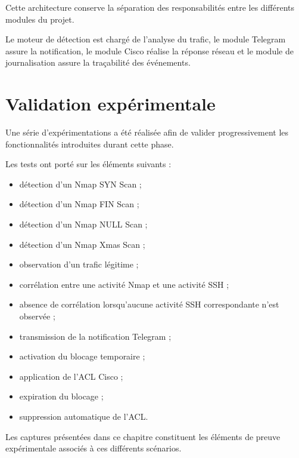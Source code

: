 Cette architecture conserve la séparation des responsabilités entre les différents modules du projet.

Le moteur de détection est chargé de l'analyse du trafic, le module Telegram assure la notification, le module Cisco réalise la réponse réseau et le module de journalisation assure la traçabilité des événements.

\section{Validation expérimentale}

Une série d'expérimentations a été réalisée afin de valider progressivement les fonctionnalités introduites durant cette phase.

Les tests ont porté sur les éléments suivants :

\begin{itemize}

\item détection d'un Nmap SYN Scan ;

\item détection d'un Nmap FIN Scan ;

\item détection d'un Nmap NULL Scan ;

\item détection d'un Nmap Xmas Scan ;

\item observation d'un trafic légitime ;

\item corrélation entre une activité Nmap et une activité SSH ;

\item absence de corrélation lorsqu'aucune activité SSH correspondante n'est observée ;

\item transmission de la notification Telegram ;

\item activation du blocage temporaire ;

\item application de l'ACL Cisco ;

\item expiration du blocage ;

\item suppression automatique de l'ACL.

\end{itemize}

Les captures présentées dans ce chapitre constituent les éléments de preuve expérimentale associés à ces différents scénarios.

